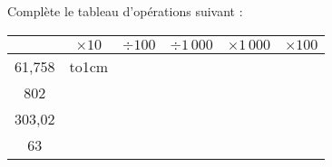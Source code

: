 \renewcommand{\arraystretch}{1.5}
Complète le tableau d'opérations suivant :
\begin{center}
  \begin{tabular}{|*{6}{m{1cm}|}}
\cline{2-6}
\multicolumn{1}{c|}{}&\multicolumn{1}{c|}{$\times10$}&\multicolumn{1}{c|}{$\div100$}&\multicolumn{1}{c|}{$\div1\,000$}&\multicolumn{1}{c|}{$\times1\,000$}&\multicolumn{1}{c|}{$\times100$}\\
\hline
\multicolumn{1}{|c|}{61,758}&\hbox to1cm{}&&&&\\
\hline
\multicolumn{1}{|c|}{802}&&&&&\\
\hline
\multicolumn{1}{|c|}{303,02}&&&&&\\
\hline
\multicolumn{1}{|c|}{63}&&&&&\\
\hline
  \end{tabular}
\end{center}
\renewcommand{\arraystretch}{1}